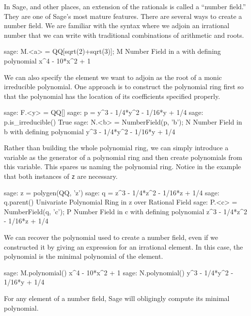 In Sage, and other places, an extension of the rationals is called a ``number field.''  They are one of Sage's most mature features.
%
%
There are several ways to create a number field.  We are familiar with the syntax where we adjoin an irrational number that we can write with traditional combinations of arithmetic and roots.
%
\begin{sageexample}
sage: M.<a> = QQ[sqrt(2)+sqrt(3)]; M
Number Field in a with defining polynomial x^4 - 10*x^2 + 1
\end{sageexample}
%
We can also specify the element we want to adjoin as the root of a monic irreducible polynomial.  One approach is to construct the polynomial ring first so that the polynomial has the location of its coefficients specified properly.
%
\begin{sageexample}
sage: F.<y> = QQ[]
sage: p = y^3 - 1/4*y^2 - 1/16*y + 1/4
sage: p.is_irreducible()
True
sage: N.<b> = NumberField(p, 'b'); N
Number Field in b with
defining polynomial y^3 - 1/4*y^2 - 1/16*y + 1/4
\end{sageexample}
%
Rather than building the whole polynomial ring, we can simply introduce a variable as the generator of a polynomial ring and then create polynomials from this variable.  This spares us naming the polynomial ring.  Notice in the example that both instances of \verb?z? are necessary.
%
\begin{sageexample}
sage: z = polygen(QQ, 'z')
sage: q = z^3 - 1/4*z^2 - 1/16*z + 1/4
sage: q.parent()
Univariate Polynomial Ring in z over Rational Field
sage: P.<c> = NumberField(q, 'c'); P
Number Field in c with
defining polynomial z^3 - 1/4*z^2 - 1/16*z + 1/4
\end{sageexample}
%
We can recover the polynomial used to create a number field, even if we constructed it by giving an expression for an irrational element.  In this case, the polynomial is the minimal polynomial of the element.
%
\begin{sageexample}
sage: M.polynomial()
x^4 - 10*x^2 + 1
sage: N.polynomial()
y^3 - 1/4*y^2 - 1/16*y + 1/4
\end{sageexample}
%
For any element of a number field, Sage will obligingly compute its minimal polynomial.
